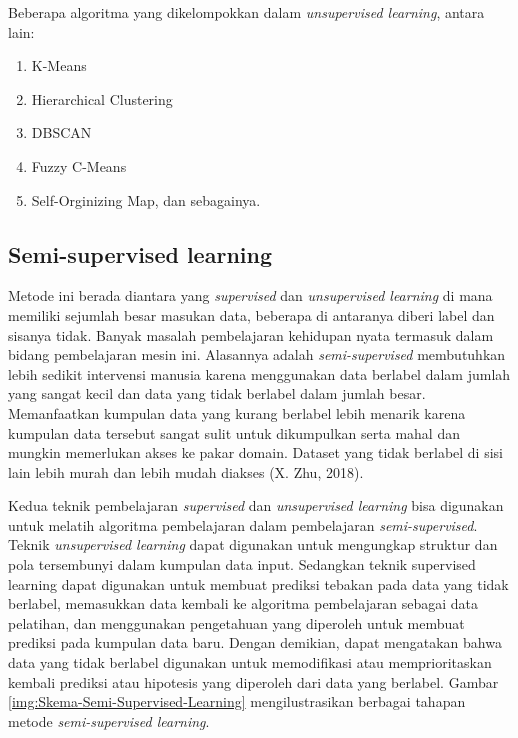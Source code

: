 Beberapa algoritma yang dikelompokkan dalam \textit{unsupervised learning}, antara lain: 
\begin{enumerate}
	\item K-Means
	\item Hierarchical Clustering
	\item DBSCAN
	\item Fuzzy C-Means
	\item Self-Orginizing Map, dan sebagainya.	
	
\end{enumerate}

\subsection{Semi-supervised learning}
\hspace{1,2cm}Metode ini berada diantara yang \textit{supervised} dan \textit{unsupervised learning} di mana memiliki sejumlah besar masukan data, beberapa di antaranya diberi label dan sisanya tidak. Banyak masalah pembelajaran kehidupan nyata termasuk dalam bidang pembelajaran mesin ini. Alasannya adalah \textit{semi-supervised} membutuhkan lebih sedikit intervensi manusia karena menggunakan data berlabel dalam jumlah yang sangat kecil dan data yang tidak berlabel dalam jumlah besar. Memanfaatkan kumpulan data yang kurang berlabel lebih menarik karena kumpulan data tersebut sangat sulit untuk dikumpulkan serta mahal dan mungkin memerlukan akses ke pakar domain. Dataset yang tidak berlabel di sisi lain lebih murah dan lebih mudah diakses (X. Zhu, 2018).

Kedua teknik pembelajaran \textit{supervised} dan \textit{unsupervised learning} bisa digunakan untuk melatih algoritma pembelajaran dalam pembelajaran \textit{semi-supervised}. Teknik \textit{unsupervised learning} dapat digunakan untuk mengungkap struktur dan pola tersembunyi dalam kumpulan data input. Sedangkan teknik supervised learning dapat digunakan untuk membuat prediksi tebakan pada data yang tidak berlabel, memasukkan data kembali ke algoritma pembelajaran sebagai data pelatihan, dan menggunakan pengetahuan yang diperoleh untuk membuat prediksi pada kumpulan data baru. Dengan demikian, dapat mengatakan bahwa data yang tidak berlabel digunakan untuk memodifikasi atau memprioritaskan kembali prediksi atau hipotesis yang diperoleh dari data yang berlabel. Gambar \ref{img:Skema-Semi-Supervised-Learning} mengilustrasikan berbagai tahapan metode \textit{semi-supervised learning}.

